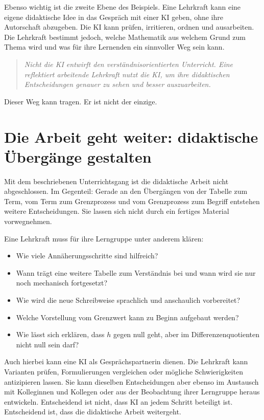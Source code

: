 \documentclass[11pt,a4paper]{article}
\newenvironment{leitgedanke}
  {\begin{quote}\color{dunkelblau}\itshape}
  {\end{quote}}
\begin{document}
Ebenso wichtig ist die zweite Ebene des Beispiels. Eine Lehrkraft kann eine
eigene didaktische Idee in das Gespräch mit einer KI geben, ohne ihre
Autorschaft abzugeben. Die KI kann prüfen, irritieren, ordnen und ausarbeiten.
Die Lehrkraft bestimmt jedoch, welche Mathematik aus welchem Grund zum Thema
wird und was für ihre Lernenden ein sinnvoller Weg sein kann.

\begin{leitgedanke}
Nicht die KI entwirft den verständnisorientierten Unterricht. Eine reflektiert
arbeitende Lehrkraft nutzt die KI, um ihre didaktischen Entscheidungen genauer
zu sehen und besser auszuarbeiten.
\end{leitgedanke}

Dieser Weg kann tragen. Er ist nicht der einzige.


\clearpage
\appendix
\section{Die Arbeit geht weiter: didaktische Übergänge gestalten}

Mit dem beschriebenen Unterrichtsgang ist die didaktische Arbeit nicht
abgeschlossen. Im Gegenteil: Gerade an den Übergängen von der Tabelle zum Term,
vom Term zum Grenzprozess und vom Grenzprozess zum Begriff entstehen weitere
Entscheidungen. Sie lassen sich nicht durch ein fertiges Material vorwegnehmen.

Eine Lehrkraft muss für ihre Lerngruppe unter anderem klären:

\begin{itemize}
  \item Wie viele Annäherungsschritte sind hilfreich?
  \item Wann trägt eine weitere Tabelle zum Verständnis bei und wann wird sie
        nur noch mechanisch fortgesetzt?
  \item Wie wird die neue Schreibweise sprachlich und anschaulich vorbereitet?
  \item Welche Vorstellung vom Grenzwert kann zu Beginn aufgebaut werden?
  \item Wie lässt sich erklären, dass $h$ gegen null geht, aber im
        Differenzenquotienten nicht null sein darf?
\end{itemize}

Auch hierbei kann eine KI als Gesprächspartnerin dienen. Die Lehrkraft kann
Varianten prüfen, Formulierungen vergleichen oder mögliche Schwierigkeiten
antizipieren lassen. Sie kann dieselben Entscheidungen aber ebenso im Austausch
mit Kolleginnen und Kollegen oder aus der Beobachtung ihrer Lerngruppe heraus
entwickeln. Entscheidend ist nicht, dass KI an jedem Schritt beteiligt ist.
Entscheidend ist, dass die didaktische Arbeit weitergeht.
\end{document}
